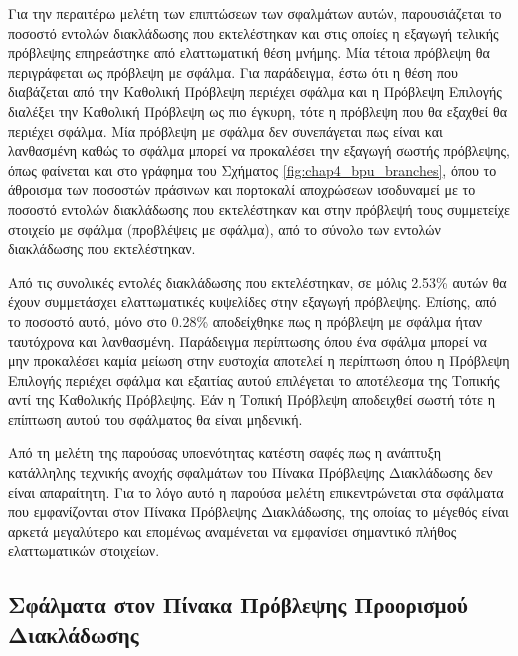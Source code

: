 Για την περαιτέρω μελέτη των επιπτώσεων των σφαλμάτων αυτών, παρουσιάζεται το ποσοστό εντολών διακλάδωσης που εκτελέστηκαν και στις οποίες η εξαγωγή τελικής πρόβλεψης επηρεάστηκε από ελαττωματική θέση μνήμης. Μία τέτοια πρόβλεψη θα περιγράφεται ως πρόβλεψη με σφάλμα. Για παράδειγμα, έστω ότι η θέση που διαβάζεται από την Καθολική Πρόβλεψη περιέχει σφάλμα και η Πρόβλεψη Επιλογής διαλέξει την Καθολική Πρόβλεψη ως πιο έγκυρη, τότε η πρόβλεψη που θα εξαχθεί θα περιέχει σφάλμα. Μία πρόβλεψη με σφάλμα δεν συνεπάγεται πως είναι και λανθασμένη καθώς το σφάλμα μπορεί να προκαλέσει την εξαγωγή σωστής πρόβλεψης, όπως φαίνεται και στο γράφημα του Σχήματος \ref{fig:chap4_bpu_branches}, όπου το άθροισμα των ποσοστών πράσινων και πορτοκαλί αποχρώσεων ισοδυναμεί με το ποσοστό εντολών διακλάδωσης που εκτελέστηκαν και στην πρόβλεψή τους συμμετείχε στοιχείο με σφάλμα (προβλέψεις με σφάλμα), από το σύνολο των εντολών διακλάδωσης που εκτελέστηκαν.
\par
Από τις συνολικές εντολές διακλάδωσης που εκτελέστηκαν, σε μόλις 2.53\% αυτών θα έχουν συμμετάσχει ελαττωματικές κυψελίδες στην εξαγωγή πρόβλεψης. Επίσης, από το ποσοστό αυτό, μόνο στο 0.28\% αποδείχθηκε πως η πρόβλεψη με σφάλμα ήταν ταυτόχρονα και λανθασμένη. Παράδειγμα περίπτωσης όπου ένα σφάλμα μπορεί να μην προκαλέσει καμία μείωση στην ευστοχία αποτελεί η περίπτωση όπου η Πρόβλεψη Επιλογής περιέχει σφάλμα και εξαιτίας αυτού επιλέγεται το αποτέλεσμα της Τοπικής αντί της Καθολικής Πρόβλεψης. Εάν η Τοπική Πρόβλεψη αποδειχθεί σωστή τότε η επίπτωση αυτού του σφάλματος θα είναι μηδενική.
\par
Από τη μελέτη της παρούσας υποενότητας κατέστη σαφές πως η ανάπτυξη κατάλληλης τεχνικής ανοχής σφαλμάτων του Πίνακα Πρόβλεψης Διακλάδωσης δεν είναι απαραίτητη. Για το λόγο αυτό η παρούσα μελέτη επικεντρώνεται στα σφάλματα που εμφανίζονται στον Πίνακα Πρόβλεψης Διακλάδωσης, της οποίας το μέγεθός είναι αρκετά μεγαλύτερο και επομένως αναμένεται να εμφανίσει σημαντικό πλήθος ελαττωματικών στοιχείων.


\subsection{Σφάλματα στον Πίνακα Πρόβλεψης Προορισμού Διακλάδωσης}
\label{chap4_BranchTargetBufferFaults}


